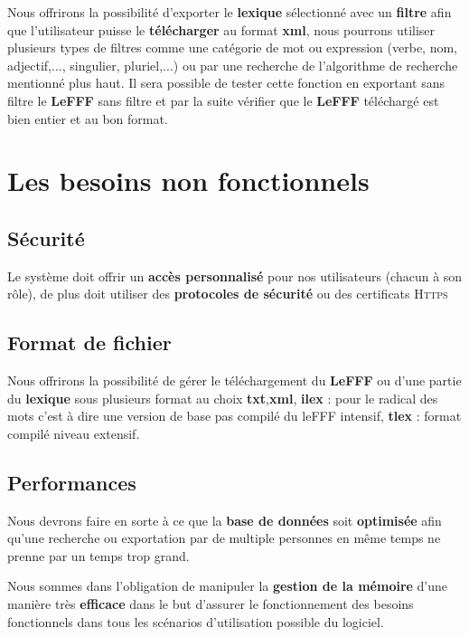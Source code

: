 {Nous offrirons la possibilité d'exporter le \textbf{lexique} sélectionné avec un \textbf{filtre} afin que l'utilisateur puisse le \textbf{télécharger} au format \textbf{xml}, nous pourrons utiliser plusieurs types de filtres comme une catégorie de mot ou expression (verbe, nom, adjectif,..., singulier, pluriel,...) ou par une recherche de l'algorithme de recherche mentionné plus haut. Il sera possible de tester cette fonction en exportant sans filtre le \textbf{LeFFF} sans filtre et par la suite vérifier que le \textbf{LeFFF} téléchargé est bien entier et au bon format.\par}



\section{Les besoins non fonctionnels}

\subsection{Sécurité}
{Le système doit offrir un \textbf{accès personnalisé} pour nos utilisateurs (chacun à son rôle), de plus doit utiliser des \textbf{protocoles de sécurité} ou des certificats \textsc{Https} }

\subsection{Format de fichier}
Nous offrirons la possibilité de gérer le téléchargement du \textbf{LeFFF} ou d'une partie du \textbf{lexique} sous plusieurs format au choix  \textbf{txt},\textbf{xml}, \textbf{ilex} : pour le radical des mots c'est à dire une version de base pas compilé du leFFF intensif, \textbf{tlex} : format compilé niveau extensif.

\subsection{Performances}

{Nous devrons faire en sorte à ce que la \textbf{base de données} soit \textbf{optimisée} afin qu'une recherche ou exportation par de multiple personnes en même temps ne prenne par un temps trop grand.\par}
Nous sommes dans l'obligation de manipuler la \textbf{gestion de la mémoire} d'une manière très \textbf{efficace} dans le but d'assurer le fonctionnement des besoins fonctionnels dans tous les scénarios d'utilisation possible du logiciel. 

